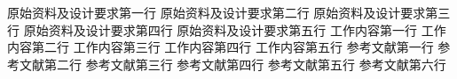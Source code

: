 \assignReq
{原始资料及设计要求第一行}
{原始资料及设计要求第二行}
{原始资料及设计要求第三行}
{原始资料及设计要求第四行}
{原始资料及设计要求第五行}
\assignWork
{工作内容第一行}
{工作内容第二行}
{工作内容第三行}
{工作内容第四行}
{工作内容第五行}
\assignRef
{参考文献第一行}
{参考文献第二行}
{参考文献第三行}
{参考文献第四行}
{参考文献第五行}
{参考文献第六行}
